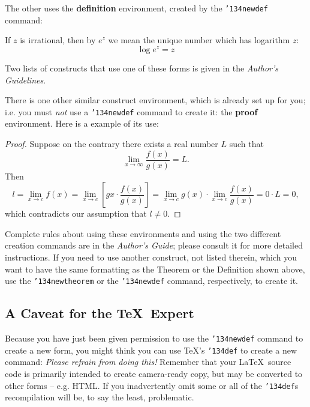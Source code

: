\documentclass{sig-alternate-05-2015}
\begin{document}
The other uses the \textbf{definition} environment, created
by the \texttt{{\char'134}newdef} command:
\begin{definition}
If $z$ is irrational, then by $e^z$ we mean the
unique number which has
logarithm $z$: \begin{displaymath}{\log e^z = z}\end{displaymath}
\end{definition}

Two lists of constructs that use one of these
forms is given in the
\textit{Author's  Guidelines}.
 
There is one other similar construct environment, which is
already set up
for you; i.e. you must \textit{not} use
a \texttt{{\char'134}newdef} command to
create it: the \textbf{proof} environment.  Here
is a example of its use:
\begin{proof}
Suppose on the contrary there exists a real number $L$ such that
\begin{displaymath}
\lim_{x\rightarrow\infty} \frac{f(x)}{g(x)} = L.
\end{displaymath}
Then
\begin{displaymath}
l=\lim_{x\rightarrow c} f(x)
= \lim_{x\rightarrow c}
\left[ g{x} \cdot \frac{f(x)}{g(x)} \right ]
= \lim_{x\rightarrow c} g(x) \cdot \lim_{x\rightarrow c}
\frac{f(x)}{g(x)} = 0\cdot L = 0,
\end{displaymath}
which contradicts our assumption that $l\neq 0$.
\end{proof}

Complete rules about using these environments and using the
two different creation commands are in the
\textit{Author's Guide}; please consult it for more
detailed instructions.  If you need to use another construct,
not listed therein, which you want to have the same
formatting as the Theorem
or the Definition\cite{salas:calculus} shown above,
use the \texttt{{\char'134}newtheorem} or the
\texttt{{\char'134}newdef} command,
respectively, to create it.

\subsection*{A {\secit Caveat} for the \TeX\ Expert}
Because you have just been given permission to
use the \texttt{{\char'134}newdef} command to create a
new form, you might think you can
use \TeX's \texttt{{\char'134}def} to create a
new command: \textit{Please refrain from doing this!}
Remember that your \LaTeX\ source code is primarily intended
to create camera-ready copy, but may be converted
to other forms -- e.g. HTML. If you inadvertently omit
some or all of the \texttt{{\char'134}def}s recompilation will
be, to say the least, problematic.
\end{document}
